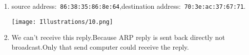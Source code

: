 \documentclass[a4paper]{article}
\begin{document}
{\begin{enumerate}
\begin{enumerate}[a]
			  \verb|192.168.2.1|
			  \begin{center} \texttt{[image: Illustrations/9.png]} \end{center}
		  \end{enumerate}
		\item source address:\verb| 86:38:35:86:8e:64|,destination address:\verb| 70:3e:ac:37:67:71|.
			  \begin{center} \texttt{[image: Illustrations/10.png]} \end{center}
		\item We can't receive this reply.Because ARP reply is sent back directly not broadcast.Only that send computer could receive the reply.

	\end{enumerate}
}
\end{document}
